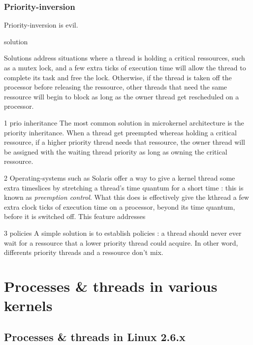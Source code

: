 \begin{frame}
\frametitle{Priority-inversion}

Priority-inversion is evil.

solution

Solutions address situations where a thread is holding a critical ressources, such as a mutex lock, and a few extra ticks of execution time will allow the thread to complete its task and free the lock. Otherwise, if the thread is taken off the processor before releasing the ressource, other threads that need the same ressource will begin to block as long as the owner thread get rescheduled on a processor.

1 prio inheritance
The most common solution in microkernel architecture is the priority inheritance. When a thread get preempted whereas holding a critical ressource, if a higher priority thread needs that ressource, the owner thread will be assigned with the waiting thread priority as long as owning the critical ressource.

2 Operating-systems such as Solaris offer a way to give a kernel thread some extra timeslices by stretching a thread's time quantum for a short time : this is known as \textit{preemption control}. What this does is effectively give the kthread a few extra clock ticks of execution time on a processor, beyond its time quantum, before it is switched off. This feature addresses 


3 policies
A simple solution is to establish policies : a thread should never ever wait for a ressource that a lower priority thread could acquire. In other word, differents priority threads and a ressource don't mix.

\end{frame}





\section{Processes \& threads in various kernels}

\subsection{Processes \& threads in Linux 2.6.x}


